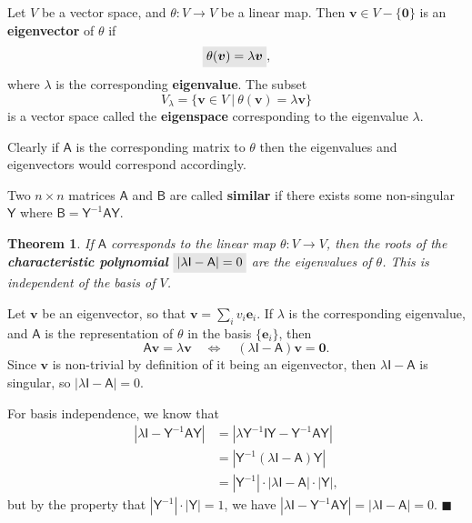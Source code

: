 \documentclass[letter-paper]{tufte-book}
\newtheorem{theorem}{\color{pastel-blue}Theorem}[section]
\newenvironment{proof}[1][Proof]{\begin{trivlist}
\item[\hskip \labelsep {\bfseries #1}]}{\end{trivlist}}
\newcommand{\As}{{\mathsf{A}}}
\newcommand{\Bs}{{\mathsf{B}}}
\newcommand{\Is}{{\mathsf{I}}}
\newcommand{\Ys}{{\mathsf{Y}}}
\newcommand{\Ob}{{\boldsymbol{0}}}
\newcommand{\eb}{{\boldsymbol{e}}}
\newcommand{\vb}{{\boldsymbol{v}}}
\newcommand{\qed}{\hfill$\blacksquare$}
\newcommand{\highlight}[1]{\mathchoice%
  {\colorbox{black!10}{$\displaystyle#1$}}%
  {\colorbox{black!10}{$\textstyle#1$}}%
  {\colorbox{black!10}{$\scriptstyle#1$}}%
  {\colorbox{black!10}{$\scriptscriptstyle#1$}}}%
\begin{document}
Let $V$ be a vector space, and $\theta:V \to V$ be a linear map. Then $\vb\in
V-\{\Ob\}$ is an \textbf{eigenvector} of $\theta$ if
\begin{equation}
  \highlight{\theta(\vb) = \lambda \vb},
\end{equation}
where $\lambda$ is the corresponding \textbf{eigenvalue}. The subset
\begin{equation}
  V_{\lambda} = \{\vb\in V \ |\ \theta(\vb) = \lambda \vb\}
\end{equation}
is a vector space called the \textbf{eigenspace} corresponding to the eigenvalue
$\lambda$.

Clearly if $\As$ is the corresponding matrix to $\theta$ then the eigenvalues
and eigenvectors would correspond accordingly.

Two $n\times n$ matrices $\As$ and $\Bs$ are called \textbf{similar} if there
exists some non-singular $\Ys$ where $\Bs = \Ys^{-1} \As \Ys$.

\begin{theorem}
  If $\As$ corresponds to the linear map $\theta:V\to V$, then the roots of the
  \textbf{characteristic polynomial} $\highlight{|\lambda\Is - \As| = 0}$ are
  the eigenvalues of $\theta$. This is independent of the basis of $V$.
\end{theorem}

\begin{proof}
  Let $\vb$ be an eigenvector, so that $\vb=\sum_i v_i\eb_i$. If $\lambda$ is
  the corresponding eigenvalue, and $\textsf{A}$ is the representation of
  $\theta$ in the basis $\{\eb_i\}$, then
  \begin{equation*}
    \As\vb = \lambda\vb \quad \Leftrightarrow \quad (\lambda\Is - \As)\vb = \Ob.
  \end{equation*}
  Since $\vb$ is non-trivial by definition of it being an eigenvector, then
  $\lambda\Is - \As$ is singular, so $|\lambda\Is - \As| = 0$.
  
  For basis independence, we know that
  \begin{align*}
    |\lambda\Is - \Ys^{-1}\As\Ys| &= |\lambda\Ys^{-1}\Is\Ys - \Ys^{-1}\As\Ys| \\
      & = |\Ys^{-1}(\lambda\Is- \As)\Ys|\\
      & = |\Ys^{-1}| \cdot |\lambda\Is- \As| \cdot |\Ys|,
  \end{align*}
  but by the property that $|\Ys^{-1}| \cdot |\Ys| = 1$, we have $|\lambda\Is -
  \Ys^{-1}\As\Ys| = |\lambda\Is- \As| = 0$. \qed
\end{proof}
\end{document}

